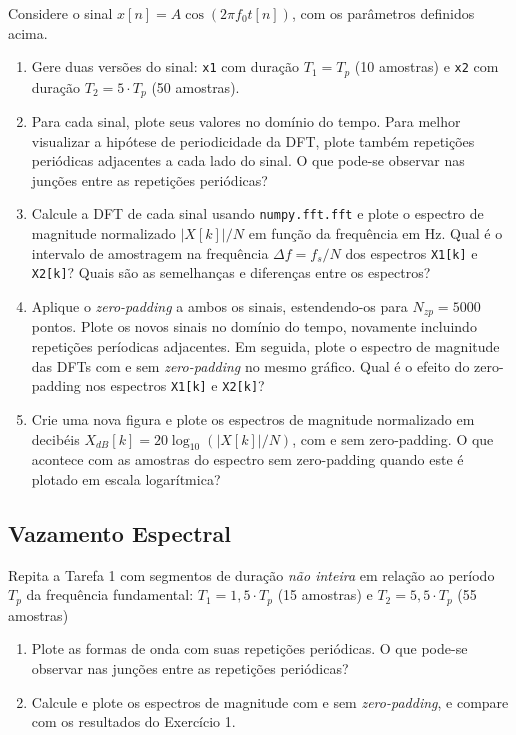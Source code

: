 \documentclass[a4paper,twoside,12pt]{article}
\begin{document}
	Considere o sinal $x[n] = A\cos(2\pi f_0 t[n])$, com os parâmetros definidos acima.
	
	\begin{enumerate}
		\item Gere duas versões do sinal: \texttt{x1} com duração $T_1 = T_p$ (10 amostras) e \texttt{x2} com duração $T_2 = 5 \cdot T_p$ (50 amostras).
		
		\item Para cada sinal, plote seus valores no domínio do tempo. Para melhor visualizar a hipótese de periodicidade da DFT, plote também repetições periódicas adjacentes a cada lado do sinal. O que pode-se observar nas junções entre as repetições periódicas?
		
		\item Calcule a DFT de cada sinal usando \texttt{numpy.fft.fft} e plote o espectro de magnitude normalizado $|X[k]|/N$ em função da frequência em Hz. Qual é o intervalo de amostragem na frequência $\Delta f = f_s/N$ dos espectros \texttt{X1[k]} e \texttt{X2[k]}? Quais são as semelhanças e diferenças entre os espectros?
		
		\item Aplique o \textit{zero-padding} a ambos os sinais, estendendo-os para $N_{zp} = 5000$ pontos. Plote os novos sinais no domínio do tempo, novamente incluindo repetições períodicas adjacentes. Em seguida, plote o espectro de magnitude das DFTs com e sem \textit{zero-padding} no mesmo gráfico. Qual é o efeito do zero-padding nos espectros \texttt{X1[k]} e \texttt{X2[k]}?
		
		\item Crie uma nova figura e plote os espectros de magnitude normalizado em decibéis $X_{dB}[k] = 20 \log_{10} (|X[k]|/N)$, com e sem zero-padding. O que acontece com as amostras do espectro sem zero-padding quando este é plotado em escala logarítmica?
	\end{enumerate}
	
	
	\subsection{Vazamento Espectral}
	
	Repita a Tarefa 1 com segmentos de duração \emph{não inteira} em relação ao período $T_p$ da frequência fundamental: $T_1 = 1,5 \cdot T_p$ (15 amostras) e $T_2 = 5,5 \cdot T_p$ (55 amostras)
	
	\begin{enumerate}
		\item Plote as formas de onda com suas repetições periódicas. O que pode-se observar nas junções entre as repetições periódicas?
		
		\item Calcule e plote os espectros de magnitude com e sem \textit{zero-padding}, e compare com os resultados do Exercício 1.
	\end{enumerate}
	
\end{document}
